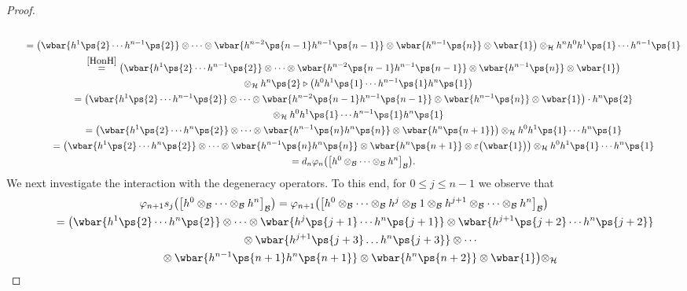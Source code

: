 \begin{proof}
\begin{gather*}
\\
\qquad
=\big(\wbar{h^1\ps{2}\cdots h^{n-1}\ps{2}} \otimes \cdots
\otimes \wbar{h^{n-2}\ps{n-1}h^{n-1}\ps{n-1}} \otimes \wbar{h^{n-1}\ps{n}} \otimes
\wbar{1}\big)
 \otimes_{\cal H} h^nh^0h^1\ps{1}\cdots h^{n-1}\ps{1}
\\
\qquad
\stackrel{\eqref{HonH}}{=}
\big(\wbar{h^1\ps{2}\cdots h^{n-1}\ps{2}} \otimes\cdots
\otimes \wbar{h^{n-2}\ps{n-1}h^{n-1}\ps{n-1}} \otimes \wbar{h^{n-1}\ps{n}} \otimes
\wbar{1}\big) \\
\qquad\hphantom{=}{}
\otimes_{\cal H} h^n\ps{2}\triangleright \big(h^0h^1\ps{1}\cdots h^{n-1}\ps{1}h^n\ps{1}\big)
\\
\qquad
=\big(\wbar{h^1\ps{2}\cdots h^{n-1}\ps{2}} \otimes\cdots
\otimes \wbar{h^{n-2}\ps{n-1}h^{n-1}\ps{n-1}} \otimes \wbar{h^{n-1}\ps{n}} \otimes \wbar{1}\big)\cdot
h^n\ps{2} \\
\qquad
\phantom{=}
\otimes_{\cal H} h^0h^1\ps{1}\cdots h^{n-1}\ps{1}h^n\ps{1}
\\
\qquad
=\big(\wbar{h^1\ps{2}\cdots h^{n}\ps{2}} \otimes\dots\otimes \wbar{h^{n-1}\ps{n}h^{n}\ps{n}} \otimes
\wbar{h^{n}\ps{n+1}} \big) \otimes_{\cal H} h^0h^1\ps{1}\cdots h^{n}\ps{1}
\\
\qquad
=\big(\wbar{h^1\ps{2}\cdots h^{n}\ps{2}} \otimes\cdots\otimes \wbar{h^{n-1}\ps{n}h^{n}\ps{n}} \otimes
\wbar{h^{n}\ps{n+1}}\otimes\varepsilon\big(\wbar{1}\big) \big) \otimes_{\cal H} h^0h^1\ps{1}\cdots h^{n}\ps{1}
\\
\qquad
=d_n\varphi_{n}\big(\big[h^0\otimes_{\cal B}\cdots\otimes_{\cal B} h^n\big]_{\cal B}\big).
\end{gather*}
We next investigate the interaction with the degeneracy operators.
To this end, for $0\leq j \leq n-1$ we observe that
\begin{gather*}
\varphi_{n+1}s_j\big(\big[h^0\otimes_{\cal B}\cdots\otimes_{\cal B} h^n\big]_{\cal B}\big)
=\varphi_{n+1}\big(\big[h^0\otimes_{\cal B}\cdots\otimes_{\cal B} h^j\otimes_{\cal B} 1\otimes_{\cal B} h^{j+1}\otimes_{\cal
B}\cdots\otimes_{\cal B} h^{n}\big]_{\cal B}\big)
\\
\qquad
=\big(\wbar{h^1\ps{2}\cdots h^n\ps{2}} \otimes\cdots
\otimes \wbar{h^j\ps{j+1}\cdots h^n\ps{j+1}} \otimes \wbar{h^{j+1}\ps{j+2}\cdots h^n\ps{j+2}}\\
\qquad
\phantom{=}{}
\otimes
\wbar{h^{j+1}\ps{j+3}\dots h^n\ps{j+3}}\otimes\cdots
\\
\qquad
\phantom{=}{}
\otimes \wbar{h^{n-1}\ps{n+1}h^n\ps{n+1}} \otimes \wbar{h^n\ps{n+2}} \otimes \wbar{1}\big) \otimes_{\cal H}

\end{gather*}
\end{proof}
